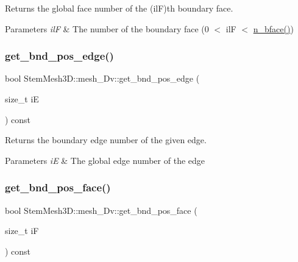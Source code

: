 Returns the global face number of the (ilF)\textquotesingle{}th boundary face. 


\begin{DoxyParams}{Parameters}
{\em ilF} & The number of the boundary face (0 $<$ ilF $<$ \hyperlink{classStemMesh3D_1_1mesh__3Dv_a394bc87d5f29715e6faae1e2d21ceff7}{n\+\_\+bface()}) \\
\hline
\end{DoxyParams}
\mbox{\label{classStemMesh3D_1_1mesh__3Dv_a6d613200a8b1f52a99536d7178984ab9}} 
\subsubsection{\texorpdfstring{get\+\_\+bnd\+\_\+pos\+\_\+edge()}{get\_bnd\_pos\_edge()}}
{\footnotesize\ttfamily bool Stem\+Mesh3\+D\+::mesh\+\_\+Dv\+::get\+\_\+bnd\+\_\+pos\+\_\+edge (\begin{DoxyParamCaption}\item[{size\+\_\+t}]{iE }\end{DoxyParamCaption}) const}



Returns the boundary edge number of the given edge. 


\begin{DoxyParams}{Parameters}
{\em iE} & The global edge number of the edge \\
\hline
\end{DoxyParams}
\mbox{\label{classStemMesh3D_1_1mesh__3Dv_a862e96e989afcfb4f32f50f6e3096740}} 
\subsubsection{\texorpdfstring{get\+\_\+bnd\+\_\+pos\+\_\+face()}{get\_bnd\_pos\_face()}}
{\footnotesize\ttfamily bool Stem\+Mesh3\+D\+::mesh\+\_\+Dv\+::get\+\_\+bnd\+\_\+pos\+\_\+face (\begin{DoxyParamCaption}\item[{size\+\_\+t}]{iF }\end{DoxyParamCaption}) const}



